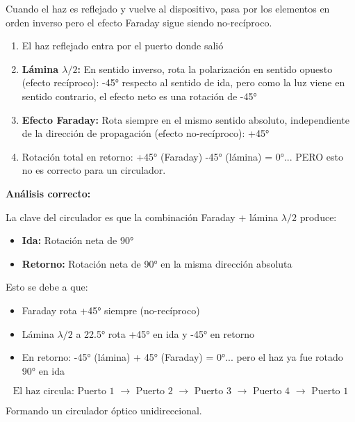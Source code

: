 \documentclass[12pt,a4paper]{article}
\begin{document}
Cuando el haz es reflejado y vuelve al dispositivo, pasa por los elementos en orden inverso pero el efecto Faraday sigue siendo no-recíproco.

\begin{enumerate}
    \item El haz reflejado entra por el puerto donde salió
    
    \item \textbf{Lámina $\lambda/2$:} En sentido inverso, rota la polarización en sentido opuesto (efecto recíproco): -45° respecto al sentido de ida, pero como la luz viene en sentido contrario, el efecto neto es una rotación de -45°
    
    \item \textbf{Efecto Faraday:} Rota siempre en el mismo sentido absoluto, independiente de la dirección de propagación (efecto no-recíproco): +45°
    
    \item Rotación total en retorno: +45° (Faraday) -45° (lámina) = 0°... PERO esto no es correcto para un circulador.
\end{enumerate}

\textbf{Análisis correcto:}

La clave del circulador es que la combinación Faraday + lámina $\lambda/2$ produce:
\begin{itemize}
    \item \textbf{Ida:} Rotación neta de 90°
    \item \textbf{Retorno:} Rotación neta de 90° en la misma dirección absoluta
\end{itemize}

Esto se debe a que:
\begin{itemize}
    \item Faraday rota +45° siempre (no-recíproco)
    \item Lámina $\lambda/2$ a 22.5° rota +45° en ida y -45° en retorno
    \item En retorno: -45° (lámina) + 45° (Faraday) = 0°... pero el haz ya fue rotado 90° en ida
\end{itemize}

\begin{equation}
\boxed{\text{El haz circula: Puerto 1 } \rightarrow \text{ Puerto 2 } \rightarrow \text{ Puerto 3 } \rightarrow \text{ Puerto 4 } \rightarrow \text{ Puerto 1}}
\end{equation}

Formando un circulador óptico unidireccional.
\end{document}
